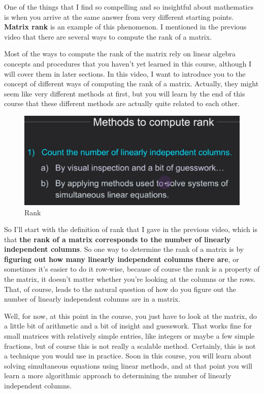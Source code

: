 \documentclass[fleqn,10pt]{olplainarticle}
\theoremstyle{definition}
\theoremstyle{remark}
\begin{document}
One of the things that I find so compelling and so insightful about mathematics is when you arrive at the same answer from very different starting points. \textbf{Matrix rank} is an example of this phenomenon. I mentioned in the previous video that there are several ways to compute the rank of a matrix.

Most of the ways to compute the rank of the matrix rely on linear algebra concepts and procedures that you haven't yet learned in this course, although I will cover them in later sections. In this video, I want to introduce you to the concept of different ways of computing the rank of a matrix. Actually, they might seem like very different methods at first, but you will learn by the end of this course that these different methods are actually quite related to each other.

\begin{figure}[ht]
	\centering
	\includegraphics[width=0.4\linewidth]{images/rank-13.png}
	\caption{Rank}
	\label{fig:rank_13}
\end{figure}

So I'll start with the definition of rank that I gave in the previous video, which is that \textbf{the rank of a matrix corresponds to the number of linearly independent columns}. So one way to determine the rank of a matrix is by \textbf{figuring out how many linearly independent columns there are}, or sometimes it's easier to do it row-wise, because of course the rank is a property of the matrix, it doesn't matter whether you're looking at the columns or the rows. That, of course, leads to the natural question of how do you figure out the number of linearly independent columns are in a matrix. 

Well, for now, at this point in the course, you just have to look at the matrix, do a little bit of arithmetic and a bit of insight and guesswork. That works fine for small matrices with relatively simple entries, like integers or maybe a few simple fractions, but of course this is not really a scalable method.  Certainly, this is not a technique you would use in practice. Soon in this course, you will learn about solving simultaneous equations using linear methods, and at that point you will learn a more algorithmic approach to determining the number of linearly independent columns.
\end{document}
